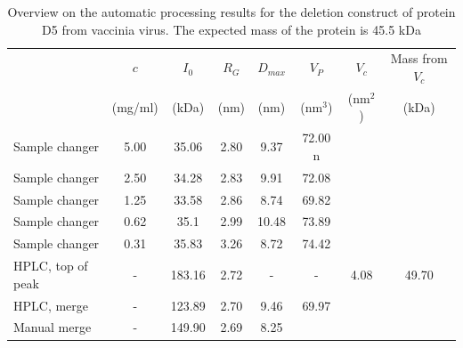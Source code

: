 \documentclass[preprint,pdf]{iucr}              %
\begin{document}
\begin{table}
\begin{tabular}{ l c | c c c c c c }
   & $c$  & $I_{0}$  & $R_{G}$ & $D_{max}$ & $V_{P}$ & $V_{c}$ & Mass from $V_{c}$\\
	 &  (mg/ml) & (kDa) & (nm)&  (nm)&  (nm$^{3}$) & (nm$^{2}$) & (kDa)\\
\hline
Sample changer & 5.00  & 35.06 & 2.80 & 9.37  & 72.00 n& &  \\
Sample changer & 2.50  & 34.28 & 2.83  & 9.91  & 72.08 & &  \\
Sample changer & 1.25 & 33.58& 2.86  & 8.74  & 69.82 & &  \\
Sample changer & 0.62  & 35.1& 2.99  & 10.48 & 73.89 & &  \\
Sample changer & 0.31 & 35.83  & 3.26  & 8.72  & 74.42& &  \\
HPLC, top of peak & - & 183.16 & 2.72  & -  & - & 4.08 & 49.70 \\
HPLC, merge & - & 123.89 & 2.70  & 9.46 & 69.97 & &  \\
Manual merge & - &  149.90 & 2.69 & 8.25 & & &  \\
\end{tabular}
\caption{Overview on the automatic processing results for the deletion construct of protein D5 from vaccinia virus. The expected mass of the protein is 45.5 kDa}
\label{tbl:results}
\end{table}
\end{document}
